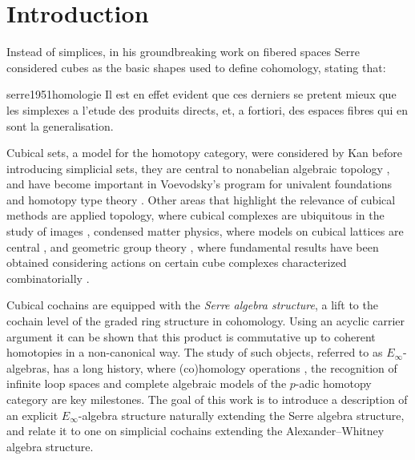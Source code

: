 \section{Introduction} \label{s:introduction}

Instead of simplices, in his groundbreaking work on fibered spaces Serre considered cubes as the basic shapes used to define cohomology, stating that:
\begin{displaycquote}[p.431]{serre1951homologie}
	Il est en effet evident que ces derniers se pretent mieux que les simplexes a l'etude des produits directs, et, a fortiori, des espaces fibres qui en sont la generalisation.
\end{displaycquote}
Cubical sets, a model for the homotopy category, were considered by Kan \cite{kan1955abstract, kan1956abstract} before introducing simplicial sets, they are central to nonabelian algebraic topology \cite{brown2011nonabelian}, and have become important in Voevodsky's program for univalent foundations and homotopy type theory \cite{kapulkin2020straightening, mortberg2017cubical}.
Other areas that highlight the relevance of cubical methods are applied topology, where cubical complexes are ubiquitous in the study of images \cite{tomasz2004computational}, condensed matter physics, where models on cubical lattices are central \cite{baxter1985exactlysolved}, and geometric group theory \cite{gromov1987hyperbolic}, where fundamental results have been obtained considering actions on certain cube complexes characterized combinatorially \cite{agol2013haken}.

Cubical cochains are equipped with the \textit{Serre algebra structure}, a lift to the cochain level of the graded ring structure in cohomology.
Using an acyclic carrier argument it can be shown that this product is commutative up to coherent homotopies in a non-canonical way.
The study of such objects, referred to as $E_\infty$-algebras, has a long history, where (co)homology operations \cite{steenrod1962cohomology, may1970general}, the recognition of infinite loop spaces \cite{boardman1973homotopy, may1972geometry} and complete algebraic models of the $p$-adic homotopy category \cite{mandell2001padic} are key milestones.
The goal of this work is to introduce a description of an explicit $E_\infty$-algebra structure naturally extending the Serre algebra structure, and relate it to one on simplicial cochains extending the Alexander--Whitney algebra structure.

